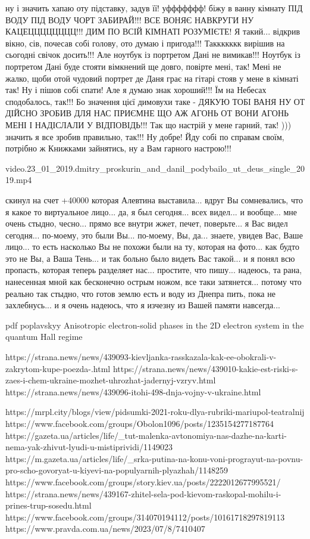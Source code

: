 ну і значить хапаю оту підставку, задув її! уффффффф! біжу в ванну кімнату ПІД
ВОДУ ПІД ВОДУ ЧОРТ ЗАБИРАЙ!!! ВСЕ ВОНЯЄ НАВКРУГИ НУ КАЦЕЦЦЦЦЦЦЦЦ!!! ДИМ ПО ВСІЙ
КІМНАТІ РОЗУМІЄТЕ!  Я такий... відкрив вікно, сів, почесав собі голову, ото
думаю і пригода!!! Таккккккк вирішив на сьогодні свічок досить!!! Але ноутбук
із портретом Дані не вимикав!!! Ноутбук із портретом Дані буде стояти вімкнений
ще довго, повірте мені, так! Мені не жалко, щоби отой чудовий портрет де Даня
грає на гітарі стояв у мене в кімнаті так! Ну і пішов собі спати! Але я думаю
знак хороший!!! Їм на Небесах сподобалось, так!!!  Бо значення цієї димовухи
таке - ДЯКУЮ ТОБІ ВАНЯ НУ ОТ ДІЙСНО ЗРОБИВ ДЛЯ НАС ПРИЄМНЕ ЩО АЖ АГОНЬ ОТ ВОНИ
АГОНЬ МЕНІ І НАДІСЛАЛИ У ВІДПОВІДЬ!!! Так що настрій у мене гарний, так! )))
значить я все зробив правильно, так!!! Ну добре! Йду собі по справам своїм, потрібно ж Книжками 
зайнятись, ну а Вам гарного настрою!!!

video.23_01_2019.dmitry_proskurin_and_danil_podybailo_ut_deus_single_2019.mp4


скинул на счет +40000 которая Алевтина выставила... вдруг Вы сомневались, что я
какое то виртуальное лицо... да, я был сегодня... всех видел... и вообще... мне
очень стыдно, чесно... прямо все внутри жжет, печет, поверьте... я Вас видел
сегодня... по-моему, это были Вы... по-моему, Вы, да... знаете, увидев Вас,
Ваше лицо... то есть насколько Вы не похожи были на ту, которая на фото... как
будто это не Вы, а Ваша Тень... и так больно было видеть Вас такой... и я понял
всю пропасть, которая теперь разделяет нас... простите, что пишу... надеюсь, та
рана, нанесенная мной как бесконечно острым ножом, все таки затянется... потому
что реально так стыдно, что готов землю есть и воду из Днепра пить, пока не
захлебнусь... и я очень надеюсь, что я изчезну из Вашей памяти навсегда...

pdf poplavskyy Anisotropic electron-solid phases in the 2D electron system in the quantum Hall regime

https://strana.news/news/439093-kievljanka-rasskazala-kak-ee-obokrali-v-zakrytom-kupe-poezda-.html
https://strana.news/news/439010-kakie-est-riski-s-zaes-i-chem-ukraine-mozhet-uhrozhat-jadernyj-vzryv.html
https://strana.news/news/439096-itohi-498-dnja-vojny-v-ukraine.html

https://mrpl.city/blogs/view/pidsumki-2021-roku-dlya-rubriki-mariupol-teatralnij
https://www.facebook.com/groups/Obolon1096/posts/1235154277187764
https://gazeta.ua/articles/life/_tut-malenka-avtonomiya-nas-dazhe-na-karti-nema-yak-zhivut-lyudi-u-mistiprividi/1149023
https://m.gazeta.ua/articles/life/_srka-putina-na-konu-voni-prograyut-na-povnu-pro-scho-govoryat-u-kiyevi-na-populyarnih-plyazhah/1148259
https://www.facebook.com/groups/story.kiev.ua/posts/2222012677995521/
https://strana.news/news/439167-zhitel-sela-pod-kievom-raskopal-mohilu-i-prines-trup-sosedu.html
https://www.facebook.com/groups/314070194112/posts/10161718297819113
https://www.pravda.com.ua/news/2023/07/8/7410407

